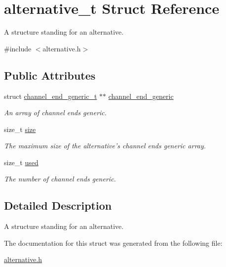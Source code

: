 \hypertarget{structalternative__t}{\section{alternative\-\_\-t Struct Reference}
\label{structalternative__t}
}


A structure standing for an alternative.  




{\ttfamily \#include $<$alternative.\-h$>$}

\subsection*{Public Attributes}
\begin{DoxyCompactItemize}
\item 
\hypertarget{structalternative__t_a38b43d51a3d5fd8bc344d51b2f837574}{struct \hyperlink{structchannel__end__generic__t}{channel\-\_\-end\-\_\-generic\-\_\-t} $\ast$$\ast$ \hyperlink{structalternative__t_a38b43d51a3d5fd8bc344d51b2f837574}{channel\-\_\-end\-\_\-generic}}\label{structalternative__t_a38b43d51a3d5fd8bc344d51b2f837574}

\begin{DoxyCompactList}\small\item\em An array of channel ends generic. \end{DoxyCompactList}\item 
\hypertarget{structalternative__t_aca939abbe3c58a9cff3444bbd8399462}{size\-\_\-t \hyperlink{structalternative__t_aca939abbe3c58a9cff3444bbd8399462}{size}}\label{structalternative__t_aca939abbe3c58a9cff3444bbd8399462}

\begin{DoxyCompactList}\small\item\em The maximum size of the alternative's channel ends generic array. \end{DoxyCompactList}\item 
\hypertarget{structalternative__t_ae7cdf9285b349c510db94f9f78a89630}{size\-\_\-t \hyperlink{structalternative__t_ae7cdf9285b349c510db94f9f78a89630}{used}}\label{structalternative__t_ae7cdf9285b349c510db94f9f78a89630}

\begin{DoxyCompactList}\small\item\em The number of channel ends generic. \end{DoxyCompactList}\end{DoxyCompactItemize}


\subsection{Detailed Description}
A structure standing for an alternative. 

The documentation for this struct was generated from the following file\-:\begin{DoxyCompactItemize}
\item 
\hyperlink{alternative_8h}{alternative.\-h}\end{DoxyCompactItemize}
